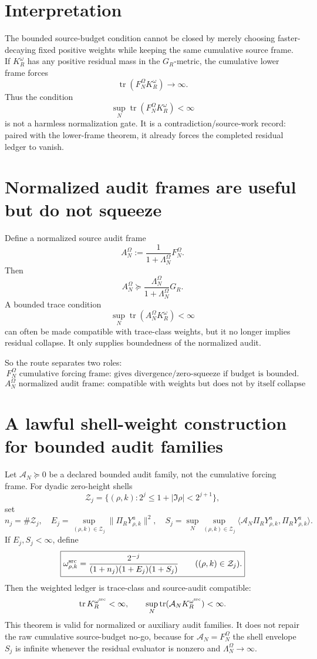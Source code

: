 \documentclass[11pt]{article}
\begin{document}
\section{Interpretation}
The bounded source-budget condition cannot be closed by merely choosing faster-decaying fixed positive weights while keeping the same cumulative source frame. If \(K_R^\omega\) has any positive residual mass in the \(G_R\)-metric, the cumulative lower frame forces
\[
\operatorname{tr}(F_N^\Omega K_R^\omega)\to\infty.
\]
Thus the condition
\[
\sup_N\operatorname{tr}(F_N^\Omega K_R^\omega)<\infty
\]
is not a harmless normalization gate. It is a contradiction/source-work record: paired with the lower-frame theorem, it already forces the completed residual ledger to vanish.

\section{Normalized audit frames are useful but do not squeeze}
Define a normalized source audit frame
\[
A_N^\Omega:=\frac{1}{1+\Lambda_N^\Omega}F_N^\Omega.
\]
Then
\[
A_N^\Omega\succeq \frac{\Lambda_N^\Omega}{1+\Lambda_N^\Omega}G_R.
\]
A bounded trace condition
\[
\sup_N\operatorname{tr}(A_N^\Omega K_R^\omega)<\infty
\]
can often be made compatible with trace-class weights, but it no longer implies residual collapse. It only supplies boundedness of the normalized audit.

So the route separates two roles:
\[
\boxed{
F_N^\Omega\text{ cumulative forcing frame: gives divergence/zero-squeeze if budget is bounded.}
}
\]
\[
\boxed{
A_N^\Omega\text{ normalized audit frame: compatible with weights but does not by itself collapse residual mass.}
}
\]

\section{A lawful shell-weight construction for bounded audit families}
Let \(\mathcal A_N\succeq0\) be a declared bounded audit family, not the cumulative forcing frame. For dyadic zero-height shells
\[
\mathcal Z_j=\{(\rho,k):2^j\le 1+|\Im\rho|<2^{j+1}\},
\]
set
\[
n_j=\#\mathcal Z_j,
\quad
E_j=\sup_{(\rho,k)\in\mathcal Z_j}\|\Pi_RY^a_{\rho,k}\|^2,
\quad
S_j=\sup_N\sup_{(\rho,k)\in\mathcal Z_j}\langle \mathcal A_N\Pi_RY^a_{\rho,k},\Pi_RY^a_{\rho,k}\rangle.
\]
If \(E_j,S_j<\infty\), define
\[
\boxed{
\omega^{\rm src}_{\rho,k}
=
\frac{2^{-j}}{(1+n_j)(1+E_j)(1+S_j)}
\qquad ((\rho,k)\in\mathcal Z_j).
}
\]
Then the weighted ledger is trace-class and source-audit compatible:
\[
\operatorname{tr}K_R^{\omega^{\rm src}}<\infty,
\qquad
\sup_N\operatorname{tr}(\mathcal A_NK_R^{\omega^{\rm src}})<\infty.
\]
This theorem is valid for normalized or auxiliary audit families. It does not repair the raw cumulative source-budget no-go, because for \(\mathcal A_N=F_N^\Omega\) the shell envelope \(S_j\) is infinite whenever the residual evaluator is nonzero and \(\Lambda_N^\Omega\to\infty\).
\end{document}
